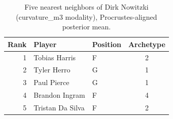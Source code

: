 \begin{table}[htbp]
  \centering\small
  \begin{tabular}{rllc}
    \toprule
    Rank & Player & Position & Archetype \\
    \midrule
    1 & Tobias Harris & F & 2 \\
    2 & Tyler Herro & G & 1 \\
    3 & Paul Pierce & G & 1 \\
    4 & Brandon Ingram & F & 4 \\
    5 & Tristan Da Silva & F & 2 \\
    \bottomrule
  \end{tabular}
  \caption{Five nearest neighbors of Dirk Nowitzki (curvature_m3 modality), Procrustes-aligned posterior mean.}
  \label{tab:Dirk_Nowitzki_neighbors_curvature_m3}
\end{table}

